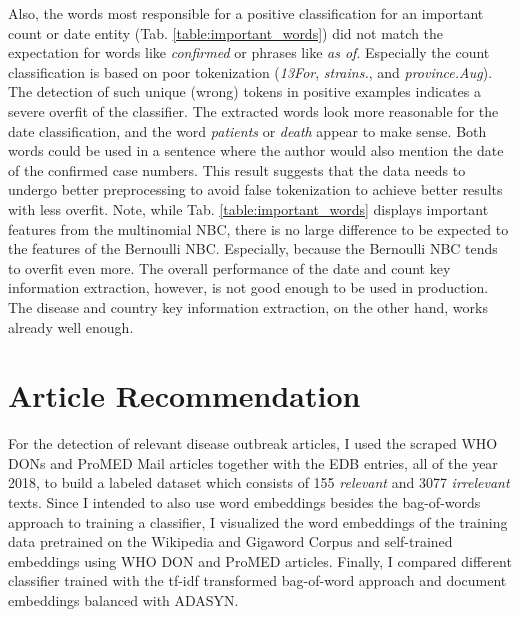   Also, the words most responsible for a positive classification for an important count or date entity (Tab. \ref{table:important_words}) did not match the expectation for words like \textit{confirmed} or phrases like \textit{as of}.
  Especially the count classification is based on poor tokenization (\textit{13For}, \textit{strains.}, and \textit{province.Aug}).
  The detection of such unique (wrong) tokens in positive examples indicates a severe overfit of the classifier.
  The extracted words look more reasonable for the date classification, and the word \textit{patients} or \textit{death} appear to make sense.
  Both words could be used in a sentence where the author would also mention the date of the confirmed case numbers.
  This result suggests that the data needs to undergo better preprocessing to avoid false tokenization to achieve better results with less overfit. Note, while Tab. \ref{table:important_words} displays important features from the multinomial NBC, there is no large difference to be expected to the features of the Bernoulli NBC.
  Especially, because the Bernoulli NBC tends to overfit even more.
  The overall performance of the date and count key information extraction, however, is not good enough to be used in production. The disease and country key information extraction, on the other hand, works already well enough.

\section{Article Recommendation}
  For the detection of relevant disease outbreak articles, I used the scraped WHO DONs and ProMED Mail articles together with the EDB entries, all of the year 2018, to build a labeled dataset which consists of 155 \textsl{relevant} and 3077 \textsl{irrelevant} texts.
  Since I intended to also use word embeddings besides the bag-of-words approach to training a classifier, I visualized the word embeddings of the training data pretrained on the Wikipedia and Gigaword Corpus and self-trained embeddings using WHO DON and ProMED articles.
  Finally, I compared different classifier trained with the tf-idf transformed bag-of-word approach and document embeddings balanced with ADASYN.

